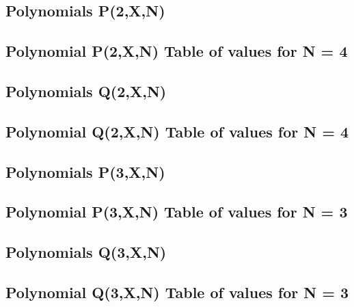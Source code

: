 \documentclass[12pt,letterpaper,oneside,reqno]{amsart}
\begin{document}
    \subsection{Polynomials P(2,X,N)}
    

    \subsection{Polynomial P(2,X,N) Table of values for N = 4}
    

    \subsection{Polynomials Q(2,X,N)}
    

    \subsection{Polynomial Q(2,X,N) Table of values for N = 4}
    

    \subsection{Polynomials P(3,X,N)}
    

    \subsection{Polynomial P(3,X,N) Table of values for N = 3}
    

    \subsection{Polynomials Q(3,X,N)}
    

    \subsection{Polynomial Q(3,X,N) Table of values for N = 3}
    


%    
%    
\end{document}
